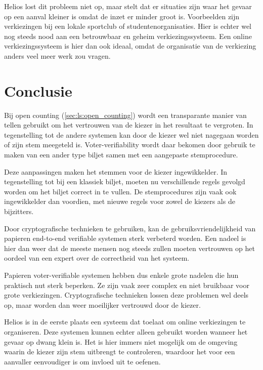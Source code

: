 \npar Helios lost dit probleem niet op, maar stelt dat er situaties zijn waar het gevaar op een aanval kleiner is omdat de inzet er minder groot is. Voorbeelden zijn verkiezingen bij een lokale sportclub of studentenorganisaties. Hier is echter wel nog steeds nood aan een betrouwbaar en geheim verkiezingssysteem. Een online verkiezingssysteem is hier dan ook ideaal, omdat de organisatie van de verkiezing anders veel meer werk zou vragen.

\section{Conclusie}
\label{sec:ls:conclusie}

Bij open counting (\ref{sec:ls:open_counting}) wordt een transparante manier van tellen gebruikt om het vertrouwen van de kiezer in het resultaat te vergroten. In tegenstelling tot de andere systemen kan door de kiezer wel niet nagegaan worden of zijn stem meegeteld is. Voter-verifiability wordt daar bekomen door gebruik te maken van een ander type biljet samen met een aangepaste stemprocedure.

\npar Deze aanpassingen maken het stemmen voor de kiezer ingewikkelder. In tegenstelling tot bij een klassiek biljet, moeten nu verschillende regels gevolgd worden om het biljet correct in te vullen. De stemprocedures zijn vaak ook ingewikkelder dan voordien, met nieuwe regels voor zowel de kiezers als de bijzitters.

\npar Door cryptografische technieken te gebruiken, kan de gebruiksvriendelijkheid van papieren end-to-end verifiable systemen sterk verbeterd worden. Een nadeel is hier dan weer dat de meeste mensen nog steeds zullen moeten vertrouwen op het oordeel van een expert over de correctheid van het systeem.

\npar Papieren voter-verifiable systemen hebben dus enkele grote nadelen die hun praktisch nut sterk beperken. Ze zijn vaak zeer complex en niet bruikbaar voor grote verkiezingen. Cryptografische technieken lossen deze problemen wel deels op, maar worden dan weer moeilijker vertrouwd door de kiezer.

\npar Helios is in de eerste plaats een systeem dat toelaat om online verkiezingen te organiseren. Deze systemen kunnen echter alleen gebruikt worden wanneer het gevaar op dwang klein is. Het is hier immers niet mogelijk om de omgeving waarin de kiezer zijn stem uitbrengt te controleren, waardoor het voor een aanvaller eenvoudiger is om invloed uit te oefenen.
